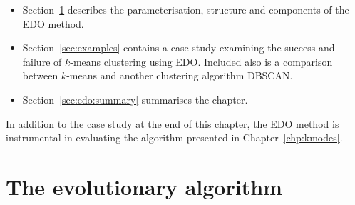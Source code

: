 \begin{itemize}
    \item Section~\ref{sec:algorithm} describes the parameterisation, structure
        and components of the EDO method.
    \item Section~\ref{sec:examples} contains a case study examining the success
        and failure of \(k\)-means clustering using EDO. Included also is a
        comparison between \(k\)-means and another clustering algorithm DBSCAN.\
    \item Section~\ref{sec:edo:summary} summarises the chapter.
\end{itemize}

In addition to the case study at the end of this chapter, the EDO method is
instrumental in evaluating the algorithm presented in Chapter~\ref{chp:kmodes}.

\section{The evolutionary algorithm}\label{sec:algorithm}

